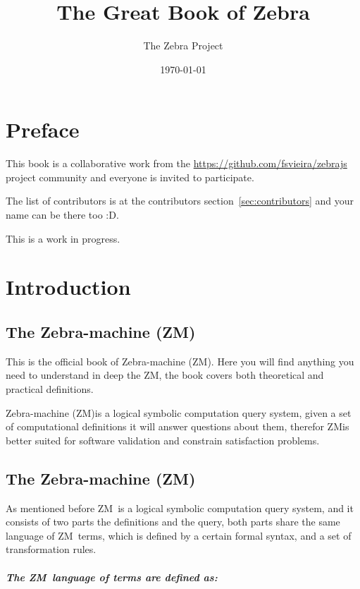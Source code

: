 \documentclass[11pt,a4paper]{report}
\newcommand{\zm}{ZM}
\newcommand{\zsystem}{Zebra-machine (\zm)}
\begin{document}
\title{The Great Book of Zebra}
\author{The Zebra Project}
\date{\today}
\maketitle

\chapter*{Preface}

This book is a collaborative work from the \href{zebrajs}{https://github.com/fsvieira/zebrajs} project community 
and everyone is invited to participate.

The list of contributors is at the contributors section~\ref{sec:contributors} and your name can be there too :D.

This is a work in progress.


\chapter{Introduction}

\section{The \zsystem}

This is the official book of \zsystem. Here you will find anything you need to understand in deep the \zm , 
the book covers both theoretical and practical definitions.

\zsystem is a logical symbolic computation query system, given a set of computational definitions it will 
answer questions about them, therefor \zm is better suited for software validation and constrain satisfaction problems.

\section{The \zsystem}

As mentioned before \zm\ is a logical symbolic computation query system, and it consists of two parts 
the definitions and the query, both parts share the same language of \zm\ terms, which is defined by 
a certain formal syntax, and a set of transformation rules.

\paragraph{The \zm\ language of terms are defined as:}
\end{document}
